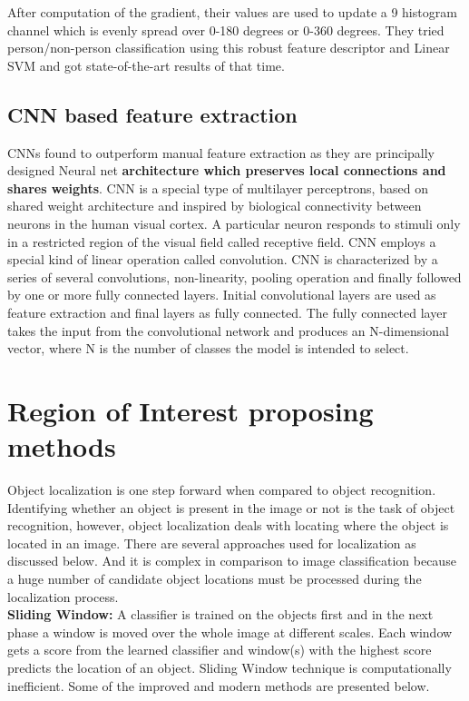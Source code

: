 \newpara After computation of the gradient, their values are used to update a 9 histogram channel which is evenly spread over 0-180 degrees or 0-360 degrees. They tried person/non-person classification using this robust feature descriptor and Linear SVM and got state-of-the-art results of that time.

\subsection{CNN based feature extraction}
\newpara CNNs found to outperform manual feature extraction as they are principally designed Neural net \textbf{architecture which preserves local connections and shares weights}. CNN is a special type of multilayer perceptrons, based on shared weight architecture and inspired by biological connectivity between neurons in the human visual cortex. A particular neuron responds to stimuli only in a restricted region of the visual field called receptive field. CNN employs a special kind of linear operation called convolution. CNN is characterized by a series of several convolutions, non-linearity, pooling operation and finally followed by one or more fully connected layers. Initial convolutional layers are used as feature extraction and final layers as fully connected. The fully connected layer takes the input from the convolutional network and produces an N-dimensional vector, where N is the number of classes the model is intended to select.


\section{Region of Interest proposing methods}
Object localization is one step forward when compared to object recognition. Identifying whether an object is present in the image or not is the task of object recognition, however, object localization deals with locating where the object is located in an image. There are several approaches used for localization as discussed below. And it is complex in comparison to image classification because a huge number of candidate object locations must be processed during the localization process. \\

\textbf{Sliding Window:} A classifier is trained on the objects first and in the next phase a window is moved over the whole image at different scales. Each window gets a score from the learned classifier and window(s) with the highest score predicts the location of an object. Sliding Window technique is computationally inefficient. Some of the improved and modern methods are presented below. 

